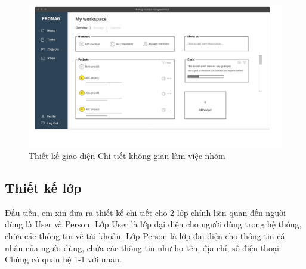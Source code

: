 \documentclass[../DoAn.tex]{subfiles}
\begin{document}
\begin{figure}[H]
    \centering
    \includegraphics[width=1.0\linewidth]{Hinhve/Mockup_MyWorkspace.png}
    \caption{Thiết kế giao diện Chi tiết không gian làm việc nhóm}
    \label{fig:Mockup_MyWorkspace}
\end{figure}

\newpage

\subsection{Thiết kế lớp}
\label{subsection:4.2.2}

Đầu tiền, em xin đưa ra thiết kế chi tiết cho 2 lớp chính liên quan đến người dùng là User và Person.
Lớp User là lớp đại diện cho người dùng trong hệ thống, chứa các thông tin về tài khoản. Lớp Person là lớp đại diện cho thông tin
cá nhân của người dùng, chứa các thông tin như họ tên, địa chỉ, số điện thoại. Chúng có quan hệ 1-1 với nhau.
\end{document}
